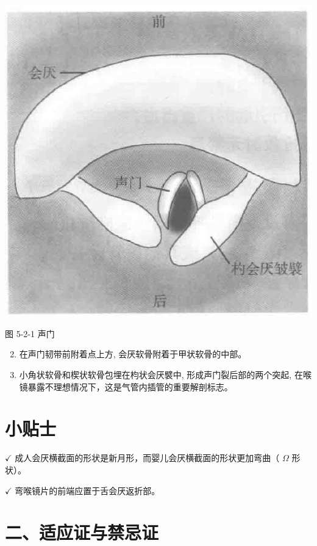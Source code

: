 \documentclass[10pt]{article}
\begin{document}
\begin{center}
\includegraphics[max width=\textwidth]{2024_07_05_645bb794a4d4f32ee0c8g-287}
\end{center}

图 5-2-1 声门

\begin{enumerate}
  \setcounter{enumi}{1}
  \item 在声门韧带前附着点上方, 会厌软骨附着于甲状软骨的中部。

  \item 小角状软骨和楔状软骨包埋在枃状会厌襞中, 形成声门裂后部的两个突起, 在喉镜暴露不理想情况下，这是气管内插管的重要解剖标志。

\end{enumerate}

\section*{小贴士}
$\checkmark$ 成人会厌横截面的形状是新月形，而婴儿会厌横截面的形状更加弯曲（ $\Omega$ 形状）。

$\checkmark$ 弯喉镜片的前端应置于舌会厌返折部。

\section*{二、适应证与禁忌证}
\end{document}
